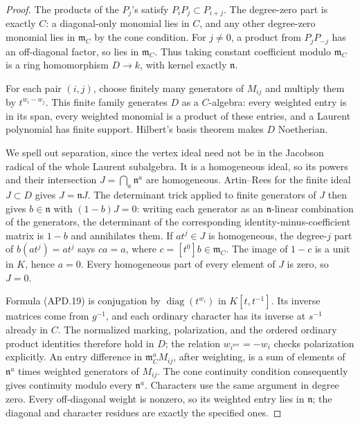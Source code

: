 \begin{proof}
The products of the \(P_j\)'s satisfy \(P_iP_j\subset P_{i+j}\).
The degree-zero part is exactly \(C\): a diagonal-only monomial
lies in \(C\), and any other degree-zero monomial lies in
\(\mathfrak m_C\) by the cone condition.  For \(j\ne0\),
a product from \(P_jP_{-j}\) has an off-diagonal factor, so
lies in \(\mathfrak m_C\).  Thus taking constant coefficient
modulo \(\mathfrak m_C\) is a ring homomorphism
\(D\to k\), with kernel exactly \(\mathfrak n\).

For each pair \((i,j)\), choose finitely many generators of
\(M_{ij}\) and multiply them by \(t^{w_i-w_j}\).  This finite
family generates \(D\) as a \(C\)-algebra: every weighted
entry is in its span, every weighted monomial is a product of
these entries, and a Laurent polynomial has finite support.
Hilbert's basis theorem makes \(D\) Noetherian.

We spell out separation, since the vertex ideal need not be in
the Jacobson radical of the whole Laurent subalgebra.  It is a
homogeneous ideal, so its powers and their intersection
\(J=\bigcap_a\mathfrak n^a\) are homogeneous.  Artin--Rees
for the finite ideal \(J\subset D\) gives \(J=\mathfrak nJ\).
The determinant trick applied to finite generators of \(J\)
then gives \(b\in\mathfrak n\) with \((1-b)J=0\): writing
each generator as an \(\mathfrak n\)-linear combination of
the generators, the determinant of the corresponding
identity-minus-coefficient matrix is \(1-b\) and annihilates
them.  If \(at^j\in J\) is homogeneous, the degree-\(j\)
part of \(b(at^j)=at^j\) says \(ca=a\), where
\(c=[t^0]b\in\mathfrak m_C\).  The image of \(1-c\) is
a unit in \(K\), hence \(a=0\).  Every homogeneous part of
every element of \(J\) is zero, so \(J=0\).

Formula (APD.19) is conjugation by
\(\operatorname{diag}(t^{w_i})\) in \(K[t,t^{-1}]\).
Its inverse matrices come from \(g^{-1}\), and each ordinary
character has its inverse at \(s^{-1}\) already in \(C\).
The normalized marking, polarization, and the ordered ordinary
product identities therefore hold in \(D\); the relation
\(w_{i^{\mathrm{rev}}}=-w_i\) checks polarization explicitly.
An entry difference in \(\mathfrak m_C^aM_{ij}\), after
weighting, is a sum of elements of \(\mathfrak n^a\) times
weighted generators of \(M_{ij}\).  The cone continuity
condition consequently gives continuity modulo every
\(\mathfrak n^a\).  Characters use the same argument in
degree zero.  Every off-diagonal weight is nonzero, so its
weighted entry lies in \(\mathfrak n\); the diagonal and
character residues are exactly the specified ones.
\end{proof}

